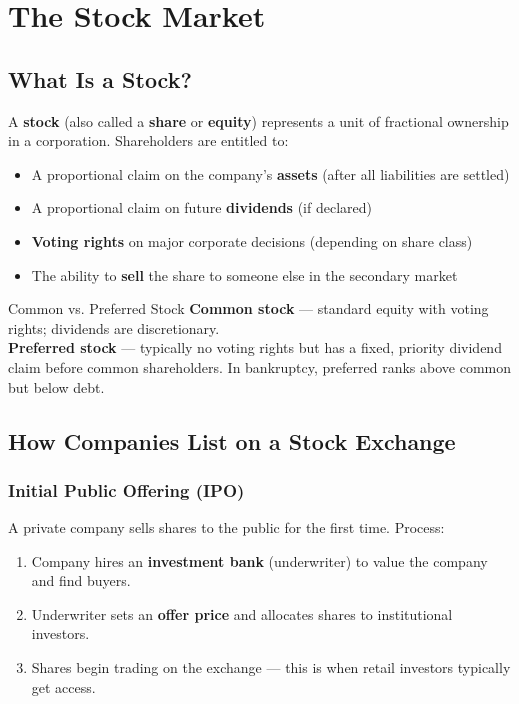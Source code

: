 
\chapter{The Stock Market}

\section{What Is a Stock?}

A \textbf{stock} (also called a \textbf{share} or \textbf{equity}) represents a unit of fractional
ownership in a corporation. Shareholders are entitled to:

\begin{itemize}
  \item A proportional claim on the company's \textbf{assets} (after all liabilities are settled)
  \item A proportional claim on future \textbf{dividends} (if declared)
  \item \textbf{Voting rights} on major corporate decisions (depending on share class)
  \item The ability to \textbf{sell} the share to someone else in the secondary market
\end{itemize}

\begin{keyterm}{Common vs. Preferred Stock}
\textbf{Common stock} — standard equity with voting rights; dividends are discretionary.\\
\textbf{Preferred stock} — typically no voting rights but has a fixed, priority dividend claim
before common shareholders. In bankruptcy, preferred ranks above common but below debt.
\end{keyterm}

\section{How Companies List on a Stock Exchange}

\subsection{Initial Public Offering (IPO)}
A private company sells shares to the public for the first time. Process:
\begin{enumerate}[label=\arabic*.]
  \item Company hires an \textbf{investment bank} (underwriter) to value the company and find buyers.
  \item Underwriter sets an \textbf{offer price} and allocates shares to institutional investors.
  \item Shares begin trading on the exchange — this is when retail investors typically get access.
\end{enumerate}

